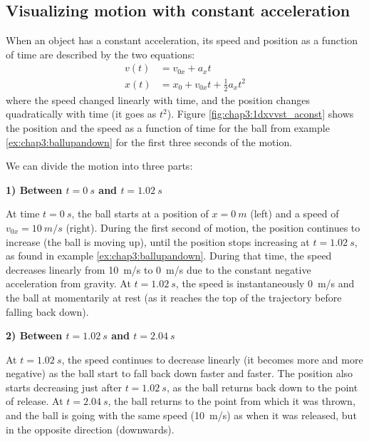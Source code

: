 \subsection{Visualizing motion with constant acceleration}

When an object has a constant acceleration, its speed and position as a function of time are described by the two equations:
\begin{align*}
v(t) &= v_{0x} + a_xt\\
x(t) &= x_0+v_{0x}t+ \frac{1}{2}a_xt^2
\end{align*}
where the speed changed linearly with time, and the position changes quadratically with time (it goes as $t^2$). Figure \ref{fig:chap3:1dxvvst_aconst} shows the position and the speed as a function of time for the ball from example \ref{ex:chap3:ballupandown} for the first three seconds of the motion.


We can divide the motion into three parts:

\textbf{1) Between $t=\SI{0}{s}$ and $t=\SI{1.02}{s}$}

At time $t=\SI{0}{s}$, the ball starts at a position of $x=\SI{0}{m}$ (left) and a speed of $v_{0x}=\SI{10}{m/s}$ (right). During the first second of motion, the position continues to increase (the ball is moving up), until the position stops increasing at $t=\SI{1.02}{s}$, as found in example \ref{ex:chap3:ballupandown}. During that time, the speed decreases linearly from \SI{10}{m/s} to \SI{0}{m/s} due to the constant negative acceleration from gravity. At $t=\SI{1,02}{s}$, the speed is instantaneously \SI{0}{m/s} and the ball at momentarily at rest (as it reaches the top of the trajectory before falling back down).

\textbf{2) Between $t=\SI{1.02}{s}$ and $t=\SI{2.04}{s}$}

At $t=\SI{1.02}{s}$, the speed continues to decrease linearly (it becomes more and more negative) as the ball start to fall back down faster and faster. The position also starts decreasing just after $t=\SI{1,02}{s}$, as the ball returns back down to the point of release. At $t=\SI{2.04}{s}$, the ball returns to the point from which it was thrown, and the ball is going with the same speed (\SI{10}{m/s}) as when it was released, but in the opposite direction (downwards).

